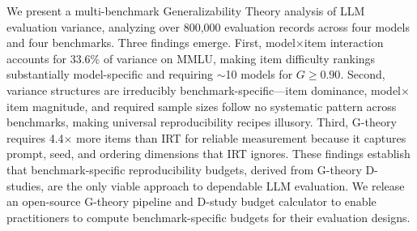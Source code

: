 \documentclass[11pt]{article}
\begin{document}
We present a multi-benchmark Generalizability Theory analysis of LLM evaluation variance, analyzing over 800{,}000 evaluation records across four models and four benchmarks.
Three findings emerge.
First, model$\times$item interaction accounts for 33.6\% of variance on MMLU, making item difficulty rankings substantially model-specific and requiring $\sim$10 models for $G \geq 0.90$.
Second, variance structures are irreducibly benchmark-specific---item dominance, model$\times$item magnitude, and required sample sizes follow no systematic pattern across benchmarks, making universal reproducibility recipes illusory.
Third, G-theory requires 4.4$\times$ more items than IRT for reliable measurement because it captures prompt, seed, and ordering dimensions that IRT ignores.
These findings establish that benchmark-specific reproducibility budgets, derived from G-theory D-studies, are the only viable approach to dependable LLM evaluation.
We release an open-source G-theory pipeline and D-study budget calculator to enable practitioners to compute benchmark-specific budgets for their evaluation designs.
\end{document}
